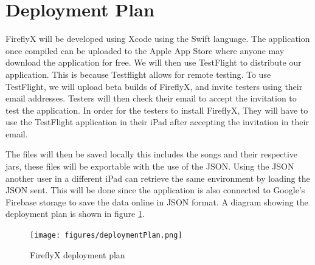 

\section{Deployment Plan}
FireflyX will be developed using Xcode using the Swift language. The application once compiled can be uploaded to the Apple App Store where anyone may download the application for free. We will then use TestFlight to distribute our application. This is because Testflight allows for remote testing. To use TestFlight, we will upload beta builds of FireflyX, and invite testers using their email addresses. Testers will then check their email to accept the invitation to test the application. In order for the testers to install FireflyX, They will have to use the TestFlight application in their iPad after accepting the invitation in their email.

The files will then be saved locally this includes the songs and their respective jars, these files will be exportable with the use of the JSON. Using the JSON another user in a different iPad can retrieve the same environment by loading the JSON sent. This will be done since the application is also connected to Google's Firebase storage to save the data online in JSON format. A diagram showing the deployment plan is shown in figure \ref{deploymentPlan}.

\begin{figure}[H]
    \centering
    \texttt{[image: figures/deploymentPlan.png]}
    \caption{FireflyX deployment plan}
    \label{deploymentPlan}
\end{figure}